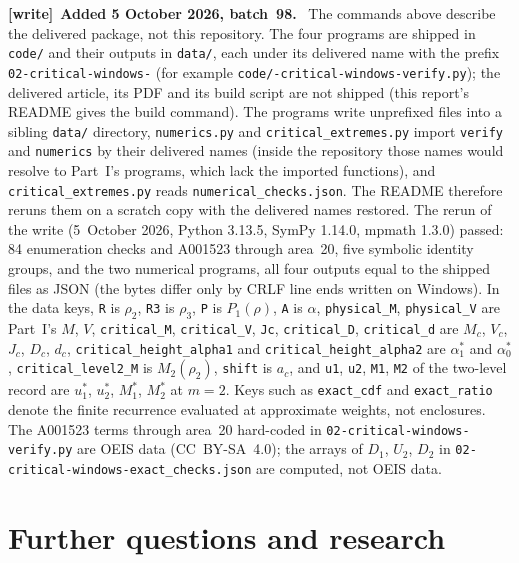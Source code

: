 \documentclass[11pt,a4paper]{article}
\numberwithin{equation}{section}
\theoremstyle{definition}\newtheorem{definition}[theorem]{Definition}
\theoremstyle{remark}\newtheorem{remark}[theorem]{Remark}
\newenvironment{writenote}[1][]{\par\smallskip\begingroup\small
 \noindent\textbf{[write]}\if\relax\detokenize{#1}\relax\else~\textbf{#1.}\fi\ }%
 {\par\endgroup\smallskip}
\begin{document}
\begin{writenote}[Added 5 October 2026, batch~98]
The commands above describe the delivered package, not this repository. The
four programs are shipped in \texttt{code/} and their outputs in
\texttt{data/}, each under its delivered name with the prefix
\texttt{02-critical-windows-} (for example
\texttt{code/-critical-windows-\allowbreak verify.py}); the
delivered article, its PDF and
its build script are not shipped (this report's README gives the build
command). The programs write unprefixed files into a sibling \texttt{data/}
directory, \texttt{numerics.py} and \texttt{critical\_extremes.py} import
\texttt{verify} and \texttt{numerics} by their delivered names (inside the
repository those names would resolve to Part~I's programs, which lack the
imported functions), and \texttt{critical\_extremes.py} reads
\texttt{numerical\_checks.json}. The README therefore reruns them on a scratch
copy with the delivered names restored. The rerun of the write (5~October
2026, Python 3.13.5, SymPy 1.14.0, mpmath 1.3.0) passed: 84 enumeration checks
and A001523 through area~20, five symbolic identity groups, and the two
numerical programs, all four outputs equal to the shipped files as JSON (the
bytes differ only by CRLF line ends written on Windows). In the data keys,
\texttt{R} is $\rho_2$, \texttt{R3} is $\rho_3$, \texttt{P} is $P_1(\rho)$,
\texttt{A} is $\alpha$, \texttt{physical\_M}, \texttt{physical\_V} are
Part~I's $M$, $V$, \texttt{critical\_M}, \texttt{critical\_V},
\texttt{Jc}, \texttt{critical\_D}, \texttt{critical\_d} are $M_c$, $V_c$,
$J_c$, $D_c$, $d_c$, \texttt{critical\_height\_alpha1} and
\texttt{critical\_height\_alpha2} are $\alpha_1^*$ and $\alpha_0^*$,
\texttt{critical\_level2\_M} is $M_2(\rho_2)$, \texttt{shift} is $a_c$, and
\texttt{u1}, \texttt{u2}, \texttt{M1}, \texttt{M2} of the two-level record are
$u_1^*$, $u_2^*$, $M_1^*$, $M_2^*$ at $m=2$. Keys such as
\texttt{exact\_cdf} and \texttt{exact\_ratio} denote the finite recurrence
evaluated at approximate weights, not enclosures. The A001523 terms through
area~20 hard-coded in \texttt{02-critical-windows-verify.py} are OEIS data
(CC~BY-SA~4.0); the arrays of $D_1$, $U_2$, $D_2$ in
\texttt{02-critical-windows-exact\_checks.json} are computed, not OEIS data.
\end{writenote}

\section{Further questions and research}
\label{vmb:cw:sec:future}
\end{document}
